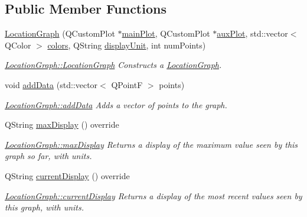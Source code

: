 \subsection*{Public Member Functions}
\begin{DoxyCompactItemize}
\item 
\hyperlink{class_location_graph_aabdd9cf30c4ff8bc2e522aab71f4f094}{Location\+Graph} (Q\+Custom\+Plot $\ast$\hyperlink{class_graph_a02239013b745a7c1411a7f8623cc2073}{main\+Plot}, Q\+Custom\+Plot $\ast$\hyperlink{class_graph_ac7d10642e5439fd87d7d4bc5a33e643d}{aux\+Plot}, std\+::vector$<$ Q\+Color $>$ \hyperlink{class_location_graph_af5c037a973c98ff0a17853f8ef661c7f}{colors}, Q\+String \hyperlink{class_graph_a28488c31277fec31c8d54a44860efede}{display\+Unit}, int num\+Points)
\begin{DoxyCompactList}\small\item\em \hyperlink{class_location_graph_aabdd9cf30c4ff8bc2e522aab71f4f094}{Location\+Graph\+::\+Location\+Graph} Constructs a \hyperlink{class_location_graph}{Location\+Graph}. \end{DoxyCompactList}\item 
void \hyperlink{class_location_graph_a7cfae63bd0a39bb8f6953053d11d7794}{add\+Data} (std\+::vector$<$ Q\+PointF $>$ points)
\begin{DoxyCompactList}\small\item\em \hyperlink{class_location_graph_a7cfae63bd0a39bb8f6953053d11d7794}{Location\+Graph\+::add\+Data} Adds a vector of points to the graph. \end{DoxyCompactList}\item 
Q\+String \hyperlink{class_location_graph_a8ac355338680e55af26cb3e74b76d278}{max\+Display} () override
\begin{DoxyCompactList}\small\item\em \hyperlink{class_location_graph_a8ac355338680e55af26cb3e74b76d278}{Location\+Graph\+::max\+Display} Returns a display of the maximum value seen by this graph so far, with units. \end{DoxyCompactList}\item 
Q\+String \hyperlink{class_location_graph_ab0f46de5c3a6b72556762bbf02d6a4b3}{current\+Display} () override
\begin{DoxyCompactList}\small\item\em \hyperlink{class_location_graph_ab0f46de5c3a6b72556762bbf02d6a4b3}{Location\+Graph\+::current\+Display} Returns a display of the most recent values seen by this graph, with units. \end{DoxyCompactList}\end{DoxyCompactItemize}
